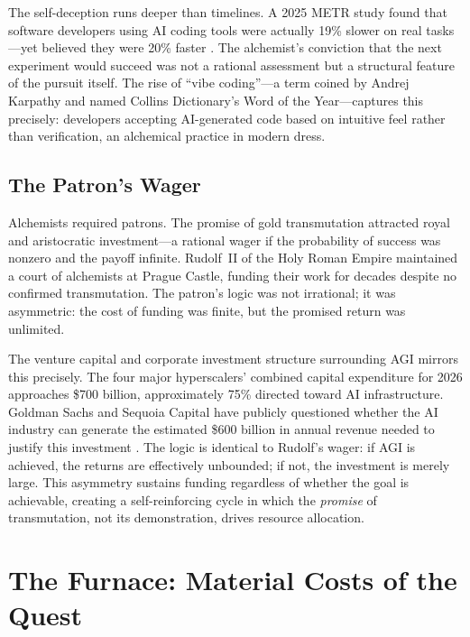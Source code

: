 \documentclass[12pt]{article}
\begin{document}
The self-deception runs deeper than timelines. A 2025 METR study found that software developers using AI coding tools were actually 19\% slower on real tasks---yet believed they were 20\% faster \citep{metr2025}. The alchemist's conviction that the next experiment would succeed was not a rational assessment but a structural feature of the pursuit itself. The rise of ``vibe coding''---a term coined by Andrej Karpathy \citep{karpathy2025} and named Collins Dictionary's Word of the Year---captures this precisely: developers accepting AI-generated code based on intuitive feel rather than verification, an alchemical practice in modern dress.

\subsection{The Patron's Wager}
\label{sec:patron}

Alchemists required patrons. The promise of gold transmutation attracted royal and aristocratic investment---a rational wager if the probability of success was nonzero and the payoff infinite. Rudolf~II of the Holy Roman Empire maintained a court of alchemists at Prague Castle, funding their work for decades despite no confirmed transmutation. The patron's logic was not irrational; it was asymmetric: the cost of funding was finite, but the promised return was unlimited.

The venture capital and corporate investment structure surrounding AGI mirrors this precisely. The four major hyperscalers' combined capital expenditure for 2026 approaches \$700 billion, approximately 75\% directed toward AI infrastructure. Goldman Sachs and Sequoia Capital have publicly questioned whether the AI industry can generate the estimated \$600 billion in annual revenue needed to justify this investment \citep{goldmansachs2024}. The logic is identical to Rudolf's wager: if AGI is achieved, the returns are effectively unbounded; if not, the investment is merely large. This asymmetry sustains funding regardless of whether the goal is achievable, creating a self-reinforcing cycle in which the \emph{promise} of transmutation, not its demonstration, drives resource allocation.

\section{The Furnace: Material Costs of the Quest}
\label{sec:furnace}
\end{document}
